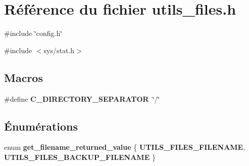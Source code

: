 \section{Référence du fichier utils\_\-files.h}
\label{utils__files_8h}
{\ttfamily \#include \char`\"{}config.h\char`\"{}}\par
{\ttfamily \#include $<$sys/stat.h$>$}\par
\subsection*{Macros}
\begin{DoxyCompactItemize}
\item 
\#define {\bf C\_\-DIRECTORY\_\-SEPARATOR}~\char`\"{}/\char`\"{}
\end{DoxyCompactItemize}
\subsection*{Énumérations}
\begin{DoxyCompactItemize}
\item 
enum {\bf get\_\-filename\_\-returned\_\-value} \{ {\bf UTILS\_\-FILES\_\-FILENAME}, 
{\bf UTILS\_\-FILES\_\-BACKUP\_\-FILENAME}
 \}
\end{DoxyCompactItemize}

